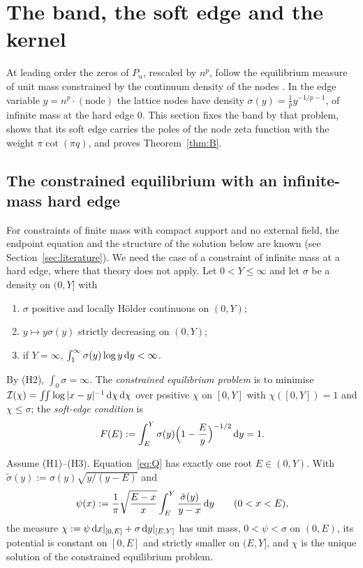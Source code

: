 \section{The band, the soft edge and the kernel}\label{sec:kernel}

At leading order the zeros of $P_n$, rescaled by $n^p$, follow the equilibrium measure of unit mass constrained by the continuum
density of the nodes \cite{Rakhmanov,DragnevSaff,PaperI}. In the edge variable $y=n^p\cdot(\text{node})$ the lattice nodes have density
$\sigma(y)=\frac1py^{-1/p-1}$, of infinite mass at the hard edge $0$. This section fixes the band by that problem, shows that its soft
edge carries the poles of the node zeta function with the weight $\pi\cot(\pi q)$, and proves Theorem~\ref{thm:B}.

\subsection{The constrained equilibrium with an infinite-mass hard edge}\label{sec:thmQ}
For constraints of finite mass with compact support and no external field, the endpoint equation and the structure of the
solution below are known \cite{BeckermannKuijlaars2001,BeckermannHelart} (see Section~\ref{sec:literature}). We need the case of a
constraint of infinite mass at a hard edge, where that theory does not apply. Let $0<Y\le\infty$ and let $\sigma$ be a density on $(0,Y]$
with
\begin{enumerate}
\item[(H1)] $\sigma$ positive and locally H\"older continuous on $(0,Y)$;
\item[(H2)] $y\mapsto y\sigma(y)$ strictly decreasing on $(0,Y)$;
\item[(H3)] if $Y=\infty$, $\int_1^\infty\sigma(y)\log y\,\mathrm{d} y<\infty$.
\end{enumerate}
By (H2), $\int_0\sigma=\infty$. The \emph{constrained equilibrium problem} is to minimise $\mathcal I(\chi)=\iint\log|x-y|^{-1}\,\mathrm{d}\chi\,\mathrm{d}\chi$ over
positive $\chi$ on $[0,Y]$ with $\chi([0,Y])=1$ and $\chi\le\sigma$; the \emph{soft-edge condition} is
\begin{equation}\label{eq:Q}
  F(E):=\int_E^Y\sigma(y)\Bigl(1-\frac Ey\Bigr)^{-1/2}\,\mathrm{d} y=1 .
\end{equation}

\begin{proposition}\label{prop:Q}
Assume \textup{(H1)--(H3)}. Equation~\eqref{eq:Q} has exactly one root $E\in(0,Y)$. With $\tilde\sigma(y):=\sigma(y)\sqrt{y/(y-E)}$ and
\begin{equation}\label{eq:nu}
  \psi(x):=\frac1\pi\sqrt{\frac{E-x}x}\int_E^Y\frac{\tilde\sigma(y)}{y-x}\,\mathrm{d} y\qquad(0<x<E),
\end{equation}
the measure $\chi:=\psi\,\mathrm{d} x|_{[0,E]}+\sigma\,\mathrm{d} y|_{[E,Y]}$ has unit mass, $0<\psi<\sigma$ on $(0,E)$, its potential is constant on
$[0,E]$ and strictly smaller on $(E,Y]$, and $\chi$ is the unique solution of the constrained equilibrium problem.
\end{proposition}

